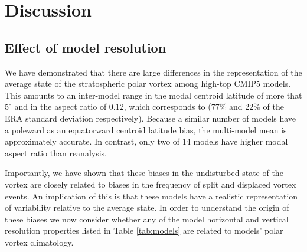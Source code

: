 \section{Discussion}
\subsection{Effect of model resolution}



We have demonstrated that there are large differences in the representation of
the average state of the stratospheric polar vortex among high-top CMIP5
models. This amounts to an inter-model range in the modal centroid latitude of
more that 5$^{\circ}$ and in the aspect ratio of 0.12, which corresponds to
(77\% and 22\% of the ERA standard deviation respectively). Because a similar
number of models have a poleward as an equatorward centroid latitude bias, the
multi-model mean is approximately accurate. In contrast, only two of 14 models
have higher modal aspect ratio than reanalysis.

Importantly, we have shown that these biases in the undisturbed state of the
vortex are closely related to biases in the frequency of split and displaced
vortex events. An implication of this is that these models have a realistic
representation of variability relative to the average state. In order to
understand the origin of these biases we now consider whether any of the model
horizontal and vertical resolution properties listed in Table \ref{tab:models}
are related to models' polar vortex climatology. %


